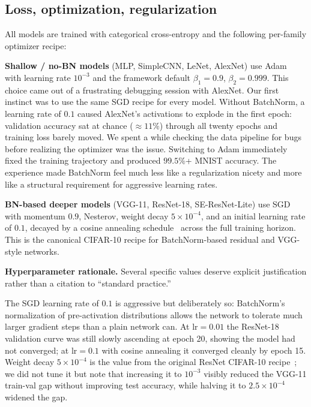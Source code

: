 \documentclass[conference,10pt]{IEEEtran}
\begin{document}
\subsection{Loss, optimization, regularization}
\label{sec:training-recipe}

All models are trained with categorical cross-entropy and the
following per-family optimizer recipe:

\noindent\textbf{Shallow / no-BN models} (MLP, SimpleCNN, LeNet,
AlexNet) use Adam~\cite{kingma2015adam} with learning rate $10^{-3}$
and the framework default $\beta_1\!=\!0.9$, $\beta_2\!=\!0.999$.
This choice came out of a frustrating debugging session with AlexNet.
Our first instinct was to use the same SGD recipe for every model.
Without BatchNorm, a learning rate of $0.1$ caused AlexNet's
activations to explode in the first epoch: validation accuracy sat
at chance ($\approx 11\%$) through all twenty epochs and training
loss barely moved. We spent a while checking the data pipeline for
bugs before realizing the optimizer was the issue. Switching to Adam
immediately fixed the training trajectory and produced $99.5\%$+
MNIST accuracy. The experience made BatchNorm feel much less like a
regularization nicety and more like a structural requirement for
aggressive learning rates.

\noindent\textbf{BN-based deeper models} (VGG-11, ResNet-18,
SE-ResNet-Lite) use SGD with momentum $0.9$, Nesterov, weight decay
$5\!\times\!10^{-4}$, and an initial learning rate of $0.1$, decayed
by a cosine annealing schedule~\cite{loshchilov2017sgdr} across the
full training horizon. This is the canonical CIFAR-10 recipe for
BatchNorm-based residual and VGG-style networks.

\noindent\textbf{Hyperparameter rationale.} Several specific values
deserve explicit justification rather than a citation to ``standard
practice.''

The SGD learning rate of $0.1$ is aggressive but deliberately so:
BatchNorm's normalization of pre-activation distributions allows the
network to tolerate much larger gradient steps than a plain network
can. At $\text{lr}\!=\!0.01$ the ResNet-18 validation curve was still
slowly ascending at epoch 20, showing the model had not converged;
at $\text{lr}\!=\!0.1$ with cosine annealing it converged cleanly by
epoch 15. Weight decay $5\!\times\!10^{-4}$ is the value from the
original ResNet CIFAR-10 recipe~\cite{he2016deep}; we did not tune
it but note that increasing it to $10^{-3}$ visibly reduced the
VGG-11 train-val gap without improving test accuracy, while halving
it to $2.5\!\times\!10^{-4}$ widened the gap.
\end{document}
